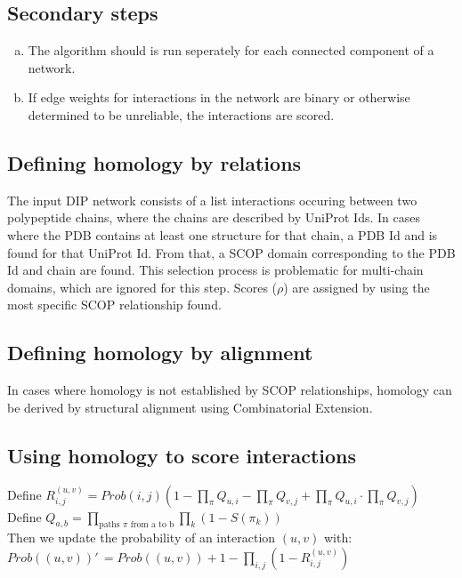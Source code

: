 \documentclass[12pt,twoside]{article}
\def\NI{\noindent}
\def\RS{
	\setlength{\itemsep}{0em}
	\setlength{\parskip}{0.4em}
	\setlength{\parsep}{0em}
}
\begin{document}
\subsection{Secondary steps}
\begin{enumerate}[a)]
\item The algorithm should is run seperately for each connected component of a network.
\item If edge weights for interactions in the network are binary or otherwise determined to be unreliable, the interactions are scored.
\end{enumerate}

\subsection*{Defining homology by relations}
\NI The input DIP network consists of a list interactions occuring between two polypeptide chains, where the chains are described by UniProt Ids. In cases where the PDB contains at least one structure for that chain, a PDB Id and is found for that UniProt Id. From that, a SCOP domain corresponding to the PDB Id and chain are found. This selection process is problematic for multi-chain domains, which are ignored for this step. Scores ($\rho$) are assigned by using the most specific SCOP relationship found.\RS

\subsection{Defining homology by alignment}

In cases where homology is not established by SCOP relationships, homology can be derived by structural alignment using Combinatorial Extension.

\subsection{Using homology to score interactions}

Define
$R_{i,j}^{(u,v)} = Prob(i,j) \left(1 - \displaystyle \prod_\pi Q_{u,i} - \prod_\pi Q_{v,j} + \prod_\pi Q_{u,i} \cdot \prod_\pi Q_{v,j} \right)$\\
Define $Q_{a,b} = \displaystyle \prod_{\text{paths } \pi \text{ from a to b}} \prod_{k} (1 - S(\pi_k))$\\
Then we update the probability of an interaction $(u,v)$ with:\\
$Prob((u,v))'\,\! = Prob((u,v)) + 1 - \displaystyle \prod_{i,j}(1 - R_{i,j}^{(u,v)})$
\end{document}
